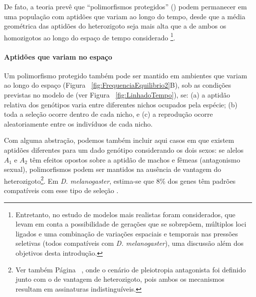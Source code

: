 \begin{refsection}
    De fato, a teoria prevê que \enquote{polimorfismos protegidos} (\cite{Charlesworth2010,Prout1968}) podem permanecer em uma população com aptidões que variam ao longo do tempo, desde que a média geométrica das aptidões do heterozigoto seja mais alta que a de ambos os homozigotos ao longo do espaço de tempo considerado \parencite{Bergland2014,Charlesworth2010,Gillespie1974}\footnote{Entretanto, no estudo de \textcite{Bergland2014} modelos mais realistas foram considerados, que levam em conta a possibilidade de gerações que se sobrepõem, múltiplos loci ligados e uma combinação de variações espaciais e temporais nas pressões seletivas (todos compatíveis com \emph{D. melanogaster}), uma discussão além dos objetivos desta introdução.}.

\paragraph{Aptidões que variam no espaço}
Um polimorfismo protegido também pode ser mantido em ambientes que variam ao longo do espaço (Figura ~\ref{fig:FrequenciaEquilibrio2}B), sob as condições previstas no modelo de \textcite{Levene1953} (ver Figura ~\ref{fig:LinhadoTempo}), se: (a) a aptidão relativa dos genótipos varia entre diferentes nichos ocupados pela espécie; (b) toda a seleção ocorre dentro de cada nicho, e (c) a reprodução ocorre aleatoriamente entre os indivíduos de cada nicho.

Com alguma abstração, podemos também incluir aqui casos em que existem aptidões diferentes para um dado genótipo considerando os dois sexos: se alelos $A_{1}$ e $A_{2}$ têm efeitos opostos sobre a aptidão de machos e fêmeas (antagonismo sexual), polimorfismos podem ser mantidos na ausência de vantagem do heterozigoto\footnote{Ver também Página ~\pageref{text:pleiotropia}, onde o cenário de pleiotropia antagonista foi definido junto com o de vantagem de heterozigoto, pois ambos os mecanismos resultam em assinaturas indistinguíveis.}. Em \emph{D. melanogaster}, estima-se que 8\% dos genes têm padrões compatíveis com esse tipo de seleção \parencite{Innocenti2010}.



\end{refsection}
